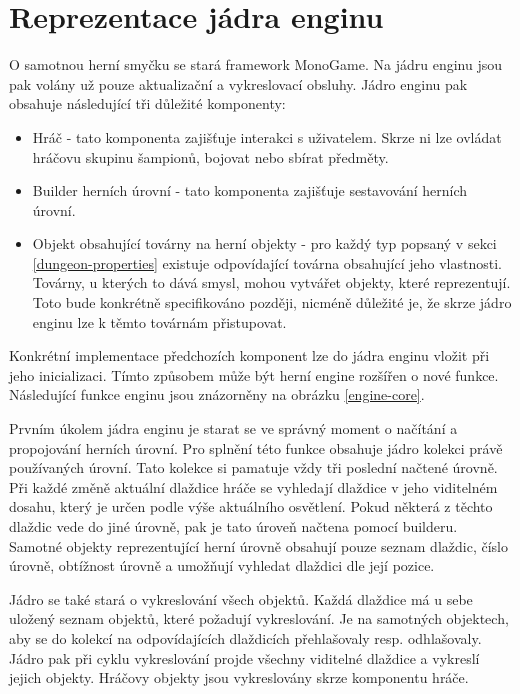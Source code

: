 \section{Reprezentace jádra enginu}\label{engine-core-section}

O samotnou herní smyčku se stará framework MonoGame. Na jádru enginu jsou pak volány už pouze aktualizační a vykreslovací obsluhy.
Jádro enginu pak obsahuje následující tři důležité komponenty:
\begin{itemize}
\item Hráč - tato komponenta zajišťuje interakci s uživatelem. Skrze ni lze ovládat hráčovu skupinu šampionů, bojovat nebo sbírat předměty.
\item Builder herních úrovní - tato komponenta zajišťuje sestavování herních úrovní.
\item Objekt obsahující továrny na herní objekty - pro každý typ popsaný v sekci \ref{dungeon-properties} existuje odpovídající
	továrna obsahující jeho vlastnosti. Továrny, u kterých to dává smysl, mohou vytvářet objekty, které reprezentují. Toto bude konkrétně
	specifikováno později, nicméně důležité je, že skrze jádro enginu lze k těmto továrnám přistupovat.
\end{itemize}
Konkrétní implementace předchozích komponent lze do jádra enginu vložit při jeho inicializaci. Tímto způsobem může být herní 
engine rozšířen o nové funkce. Následující funkce enginu jsou znázorněny na obrázku \ref{engine-core}.

Prvním úkolem jádra enginu je starat se ve správný moment o načítání a propojování herních úrovní. Pro splnění této funkce
obsahuje jádro kolekci právě používaných úrovní. Tato kolekce si pamatuje vždy tři poslední načtené úrovně.
Při každé změně aktuální dlaždice hráče se vyhledají dlaždice v jeho viditelném dosahu, který je určen podle výše aktuálního osvětlení.
Pokud některá z těchto dlaždic vede do jiné úrovně, pak je tato úroveň načtena pomocí builderu. Samotné objekty reprezentující herní úrovně 
obsahují pouze seznam dlaždic, číslo úrovně, obtížnost úrovně a umožňují vyhledat dlaždici dle její pozice. 

Jádro se také stará o vykreslování všech objektů. Každá dlaždice má u sebe uložený seznam objektů, které požadují vykreslování.
Je na samotných objektech, aby se do kolekcí na odpovídajících dlaždicích přehlašovaly resp. odhlašovaly. Jádro pak při 
cyklu vykreslování projde všechny viditelné dlaždice a vykreslí jejich objekty. Hráčovy objekty jsou vykreslovány skrze komponentu hráče.

